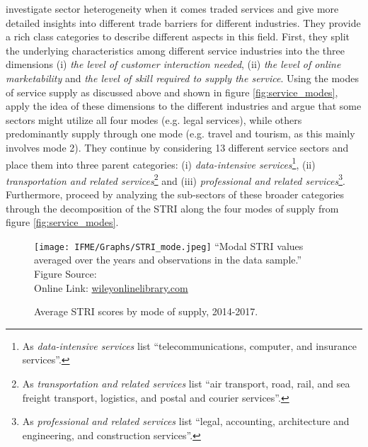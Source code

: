 \textcite{intangible_2023} investigate sector heterogeneity when it comes traded services and give more detailed insights into different trade barriers for different industries. They provide a rich class categories to describe different aspects in this field. First, they split the underlying characteristics among different service industries into the three dimensions (i) \textit{the level of customer interaction needed}, (ii) \textit{the level of online marketability} and \textit{the level of skill required to supply the service}. Using the modes of service supply as discussed above and shown in figure \ref{fig:service_modes}, \textcite{intangible_2023} apply the idea of these dimensions to the different industries and argue that some sectors might utilize all four modes (e.g. legal services), while others predominantly supply through one mode (e.g. travel and tourism, as this mainly involves mode 2). They continue by considering 13 different service sectors and place them into three parent categories: (i) \textit{data-intensive services}\footnote{As \textit{data-intensive services} \textcite{intangible_2023} list \enquote{telecommunications, computer, and insurance services}.}, (ii) \textit{transportation and related services}\footnote{As \textit{transportation and related services} \textcite{intangible_2023} list \enquote{air transport, road, rail, and sea freight transport, logistics, and postal and courier services}.} and (iii) \textit{professional and related services}\footnote{As \textit{professional and related services} \textcite{intangible_2023} list \enquote{legal, accounting, architecture and engineering, and construction services}.}. Furthermore, \textcite{intangible_2023} proceed by analyzing the sub-sectors of these broader categories through the decomposition of the STRI along the four modes of supply from figure \ref{fig:service_modes}.


\begin{figure}[ht]
    \centering
    \caption[Average STRI scores by mode of supply, 2014-2017.]{Average STRI scores by mode of supply, 2014-2017.}
    \texttt{[image: IFME/Graphs/STRI\_mode.jpeg]}
    \label{fig:STRI_modes}
    \small 
    \enquote{Modal STRI values averaged over the years and observations in the data sample.} \\
    Figure Source: \cite{intangible_2023} \\ Online Link: \href{https://onlinelibrary.wiley.com/doi/10.1111/twec.13346  }{wileyonlinelibrary.com}
\end{figure}



